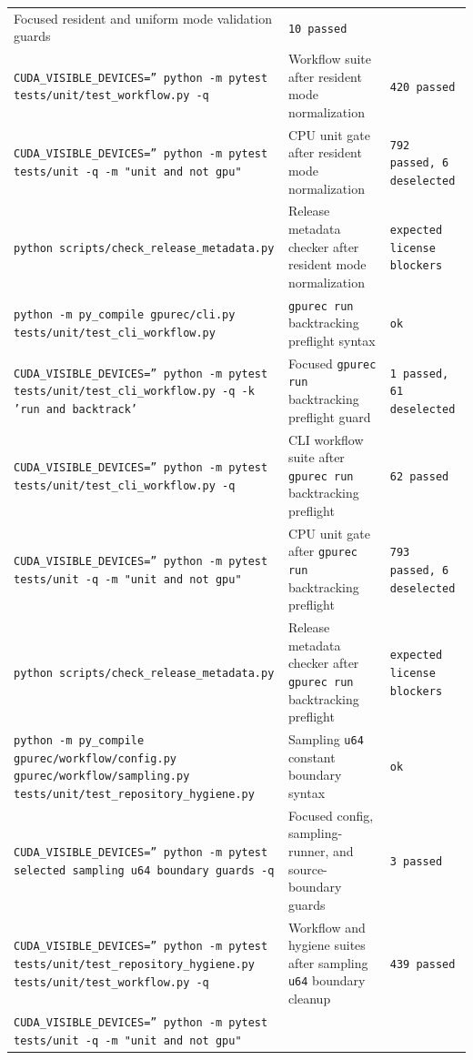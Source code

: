 \documentclass[11pt]{article}
\begin{document}
\begin{center}
\begin{tabular}{lll}
Focused resident and uniform mode validation guards &
\texttt{10 passed} \\
\texttt{CUDA\_VISIBLE\_DEVICES='' python -m pytest tests/unit/test\_workflow.py -q} &
Workflow suite after resident mode normalization &
\texttt{420 passed} \\
\texttt{CUDA\_VISIBLE\_DEVICES='' python -m pytest tests/unit -q -m "unit and not gpu"} &
CPU unit gate after resident mode normalization &
\texttt{792 passed, 6 deselected} \\
\texttt{python scripts/check\_release\_metadata.py} &
Release metadata checker after resident mode normalization &
\texttt{expected license blockers} \\
\texttt{python -m py\_compile gpurec/cli.py tests/unit/test\_cli\_workflow.py} &
\texttt{gpurec run} backtracking preflight syntax &
\texttt{ok} \\
\texttt{CUDA\_VISIBLE\_DEVICES='' python -m pytest tests/unit/test\_cli\_workflow.py -q -k 'run and backtrack'} &
Focused \texttt{gpurec run} backtracking preflight guard &
\texttt{1 passed, 61 deselected} \\
\texttt{CUDA\_VISIBLE\_DEVICES='' python -m pytest tests/unit/test\_cli\_workflow.py -q} &
CLI workflow suite after \texttt{gpurec run} backtracking preflight &
\texttt{62 passed} \\
\texttt{CUDA\_VISIBLE\_DEVICES='' python -m pytest tests/unit -q -m "unit and not gpu"} &
CPU unit gate after \texttt{gpurec run} backtracking preflight &
\texttt{793 passed, 6 deselected} \\
\texttt{python scripts/check\_release\_metadata.py} &
Release metadata checker after \texttt{gpurec run} backtracking preflight &
\texttt{expected license blockers} \\
\texttt{python -m py\_compile gpurec/workflow/config.py gpurec/workflow/sampling.py tests/unit/test\_repository\_hygiene.py} &
Sampling \texttt{u64} constant boundary syntax &
\texttt{ok} \\
\texttt{CUDA\_VISIBLE\_DEVICES='' python -m pytest selected sampling u64 boundary guards -q} &
Focused config, sampling-runner, and source-boundary guards &
\texttt{3 passed} \\
\texttt{CUDA\_VISIBLE\_DEVICES='' python -m pytest tests/unit/test\_repository\_hygiene.py tests/unit/test\_workflow.py -q} &
Workflow and hygiene suites after sampling \texttt{u64} boundary cleanup &
\texttt{439 passed} \\
\texttt{CUDA\_VISIBLE\_DEVICES='' python -m pytest tests/unit -q -m "unit and not gpu"} &

\end{tabular}
\end{center}
\end{document}
